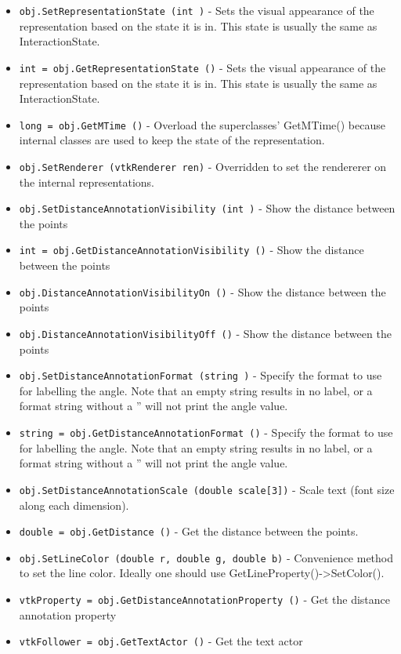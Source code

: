 \begin{itemize}
\item  \verb|obj.SetRepresentationState (int )| -  Sets the visual appearance of the representation based on the
 state it is in. This state is usually the same as InteractionState.

\item  \verb|int = obj.GetRepresentationState ()| -  Sets the visual appearance of the representation based on the
 state it is in. This state is usually the same as InteractionState.

\item  \verb|long = obj.GetMTime ()| -  Overload the superclasses' GetMTime() because internal classes
 are used to keep the state of the representation.

\item  \verb|obj.SetRenderer (vtkRenderer ren)| -  Overridden to set the rendererer on the internal representations.

\item  \verb|obj.SetDistanceAnnotationVisibility (int )| -  Show the distance between the points

\item  \verb|int = obj.GetDistanceAnnotationVisibility ()| -  Show the distance between the points

\item  \verb|obj.DistanceAnnotationVisibilityOn ()| -  Show the distance between the points

\item  \verb|obj.DistanceAnnotationVisibilityOff ()| -  Show the distance between the points

\item  \verb|obj.SetDistanceAnnotationFormat (string )| -  Specify the format to use for labelling the angle. Note that an empty
 string results in no label, or a format string without a ''%
 will not print the angle value.

\item  \verb|string = obj.GetDistanceAnnotationFormat ()| -  Specify the format to use for labelling the angle. Note that an empty
 string results in no label, or a format string without a ''%
 will not print the angle value.

\item  \verb|obj.SetDistanceAnnotationScale (double scale[3])| -  Scale text (font size along each dimension).

\item  \verb|double = obj.GetDistance ()| -  Get the distance between the points.

\item  \verb|obj.SetLineColor (double r, double g, double b)| -  Convenience method to set the line color.
 Ideally one should use GetLineProperty()->SetColor().

\item  \verb|vtkProperty = obj.GetDistanceAnnotationProperty ()| -  Get the distance annotation property

\item  \verb|vtkFollower = obj.GetTextActor ()| -  Get the text actor

\end{itemize}
